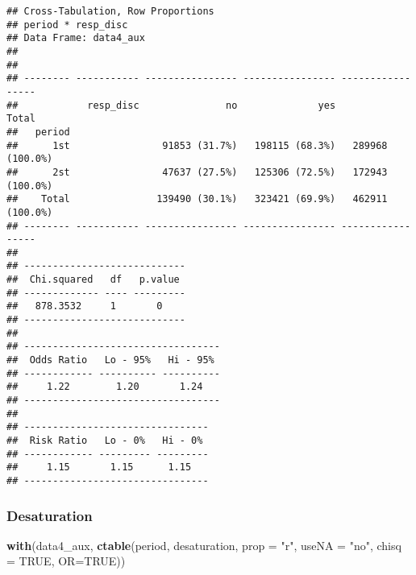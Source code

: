 \documentclass[
]{article}
\newenvironment{Shaded}{\begin{snugshade}}{\end{snugshade}}
\newcommand{\DataTypeTok}[1]{\textcolor[rgb]{0.13,0.29,0.53}{#1}}
\newcommand{\KeywordTok}[1]{\textcolor[rgb]{0.13,0.29,0.53}{\textbf{#1}}}
\newcommand{\NormalTok}[1]{#1}
\newcommand{\OtherTok}[1]{\textcolor[rgb]{0.56,0.35,0.01}{#1}}
\newcommand{\StringTok}[1]{\textcolor[rgb]{0.31,0.60,0.02}{#1}}
\begin{document}
\begin{verbatim}
## Cross-Tabulation, Row Proportions  
## period * resp_disc  
## Data Frame: data4_aux  
## 
## 
## -------- ----------- ---------------- ---------------- -----------------
##            resp_disc               no              yes             Total
##   period                                                                
##      1st                91853 (31.7%)   198115 (68.3%)   289968 (100.0%)
##      2st                47637 (27.5%)   125306 (72.5%)   172943 (100.0%)
##    Total               139490 (30.1%)   323421 (69.9%)   462911 (100.0%)
## -------- ----------- ---------------- ---------------- -----------------
## 
## ----------------------------
##  Chi.squared   df   p.value 
## ------------- ---- ---------
##   878.3532     1       0    
## ----------------------------
## 
## ----------------------------------
##  Odds Ratio   Lo - 95%   Hi - 95% 
## ------------ ---------- ----------
##     1.22        1.20       1.24   
## ----------------------------------
## 
## --------------------------------
##  Risk Ratio   Lo - 0%   Hi - 0% 
## ------------ --------- ---------
##     1.15       1.15      1.15   
## --------------------------------
\end{verbatim}

\hypertarget{desaturation-1}{%
\subsubsection{Desaturation}\label{desaturation-1}}

\begin{Shaded}
\begin{Highlighting}[]
\KeywordTok{with}\NormalTok{(data4_aux, }\KeywordTok{ctable}\NormalTok{(period, desaturation, }\DataTypeTok{prop =} \StringTok{"r"}\NormalTok{, }\DataTypeTok{useNA =} \StringTok{"no"}\NormalTok{, }\DataTypeTok{chisq =} \OtherTok{TRUE}\NormalTok{, }\DataTypeTok{OR=}\OtherTok{TRUE}\NormalTok{))}
\end{Highlighting}
\end{Shaded}
\end{document}
